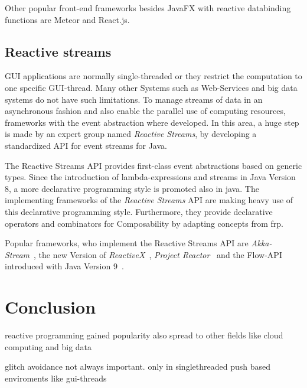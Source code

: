 \documentclass[acmsmall]{acmart}\settopmatter{printfolios=true,printccs=false,printacmref=false}
\begin{document}
		Other popular front-end frameworks besides JavaFX with reactive databinding functions are Meteor and React.js.
	\subsection{Reactive streams}
	GUI applications are normally single-threaded or they restrict the computation to one specific GUI-thread.
	Many other Systems such as Web-Services and big data systems do not have such limitations. 
	To manage streams of data in an asynchronous fashion and also enable the parallel use of computing resources, 
	frameworks with the event abstraction where developed.
	In this area, a huge step is made by an expert group named \textit{Reactive Streams}, by developing a standardized API for event streams for Java.

	The Reactive Streams API provides first-class event abstractions based on generic types.
	Since the introduction of lambda-expressions and streams in Java Version 8, a more declarative programming style is promoted also in java.
	The implementing frameworks of the \textit{Reactive Streams} API are making heavy use of this declarative programming style.
	Furthermore, they provide declarative operators and combinators for Composability by adapting concepts from \ac{frp}.

	Popular frameworks, who implement the Reactive Streams API are \textit{Akka-Stream}~\cite{akka:2018}, 
	the new Version of \textit{ReactiveX}~\cite{reactiveX:2018}, 
	\textit{Project Reactor}~\cite{projectReactor:2018} and the Flow-API introduced with Java Version 9~\cite{javaflow201800}.

\section{Conclusion}


reactive programming gained popularity also spread to other fields like cloud computing and big data \cite{Salvaneschi:2015}

glitch avoidance not always important. only in singlethreaded push based enviroments like gui-threads



\end{document}
